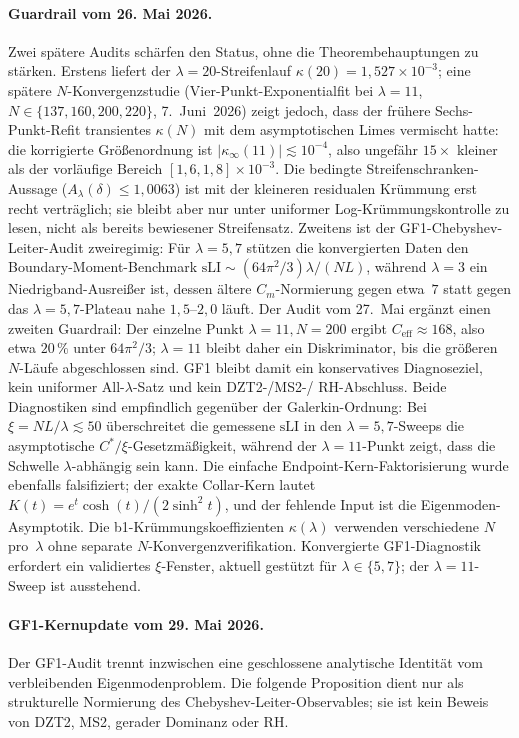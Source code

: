 \documentclass[11pt,a4paper]{article}
\theoremstyle{remark}
\theoremstyle{plain}
\begin{document}
\paragraph{Guardrail vom 26. Mai 2026.}
Zwei spätere Audits schärfen den Status, ohne die Theorembehauptungen zu
stärken. Erstens liefert der $\lambda=20$-Streifenlauf
$\kappa(20)=1{,}527\times10^{-3}$; eine spätere
$N$-Konvergenzstudie (Vier-Punkt-Exponentialfit bei $\lambda=11$,
$N\in\{137,160,200,220\}$, 7.~Juni~2026) zeigt jedoch, dass der frühere
Sechs-Punkt-Refit transientes $\kappa(N)$ mit dem asymptotischen Limes
vermischt hatte: die korrigierte Größenordnung ist
$|\kappa_\infty(11)|\lesssim 10^{-4}$, also ungefähr $15\times$ kleiner
als der vorläufige Bereich $[1{,}6,1{,}8]\times10^{-3}$. Die bedingte
Streifenschranken-Aussage ($A_\lambda(\delta)\leq1{,}0063$) ist mit der
kleineren residualen Krümmung erst recht verträglich; sie bleibt aber nur
unter uniformer Log-Krümmungskontrolle zu lesen, nicht als bereits
bewiesener Streifensatz. Zweitens ist der GF1-Chebyshev-Leiter-Audit
zweiregimig:
Für $\lambda=5,7$ stützen die konvergierten Daten den
Boundary-Moment-Benchmark $\mathrm{sLI}\sim(64\pi^2/3)\lambda/(NL)$,
während $\lambda=3$ ein Niedrigband-Ausreißer ist, dessen ältere
$C_m$-Normierung gegen etwa~$7$ statt gegen das $\lambda=5,7$-Plateau
nahe $1{,}5$--$2{,}0$ läuft. Der Audit vom 27.~Mai ergänzt einen zweiten
Guardrail: Der einzelne Punkt $\lambda=11,N=200$ ergibt
$C_{\mathrm{eff}}\approx168$, also etwa $20\,\%$ unter $64\pi^2/3$;
$\lambda=11$ bleibt daher ein Diskriminator, bis die größeren
$N$-Läufe abgeschlossen sind. GF1 bleibt damit ein konservatives
Diagnoseziel, kein uniformer All-$\lambda$-Satz und kein DZT2-/MS2-/
RH-Abschluss. Beide Diagnostiken sind empfindlich gegenüber der
Galerkin-Ordnung: Bei $\xi = NL/\lambda \lesssim 50$ überschreitet die
gemessene $\mathrm{sLI}$ in den $\lambda=5,7$-Sweeps die asymptotische
$C^*/\xi$-Gesetzmäßigkeit, während der $\lambda=11$-Punkt zeigt, dass
die Schwelle $\lambda$-abhängig sein kann. Die einfache
Endpoint-Kern-Faktorisierung wurde ebenfalls falsifiziert; der exakte
Collar-Kern lautet $K(t)=e^t\cosh(t)/(2\sinh^2t)$, und der fehlende
Input ist die Eigenmoden-Asymptotik. Die b1-Krümmungskoeffizienten
$\kappa(\lambda)$ verwenden verschiedene $N$ pro~$\lambda$ ohne separate
$N$-Konvergenzverifikation. Konvergierte GF1-Diagnostik erfordert ein
validiertes $\xi$-Fenster, aktuell gestützt für $\lambda \in \{5,7\}$;
der $\lambda = 11$-Sweep ist ausstehend.

\paragraph{GF1-Kernupdate vom 29. Mai 2026.}
Der GF1-Audit trennt inzwischen eine geschlossene analytische Identität
vom verbleibenden Eigenmodenproblem. Die folgende Proposition dient nur
als strukturelle Normierung des Chebyshev-Leiter-Observables; sie ist
kein Beweis von DZT2, MS2, gerader Dominanz oder RH.
\end{document}
